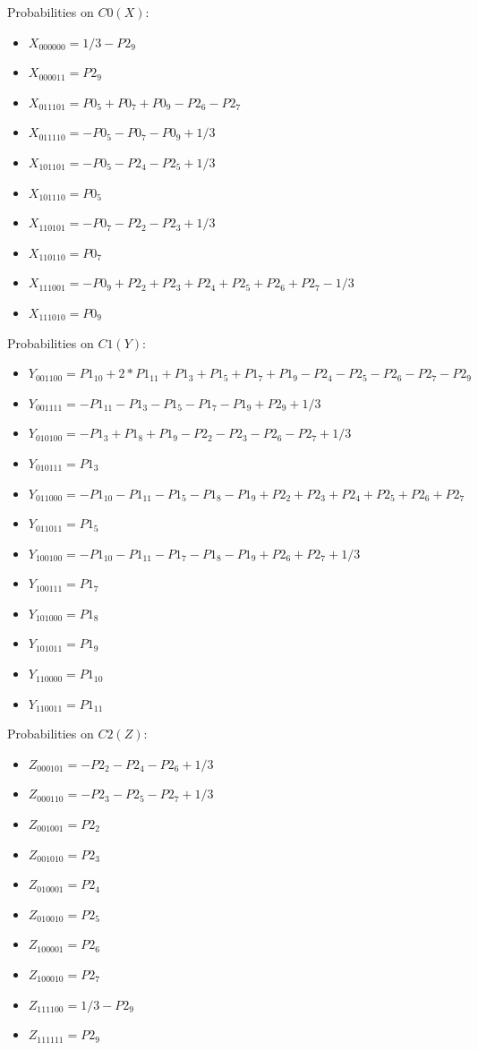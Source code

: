 \documentclass[11pt]{article}
\begin{document}
Probabilities on $C0 (X)$:
\begin{itemize}
    \item $X_{000000} = 1/3 - P2_9$
    \item $X_{000011} = P2_9$
    \item $X_{011101} = P0_5 + P0_7 + P0_9 - P2_6 - P2_7$
    \item $X_{011110} = -P0_5 - P0_7 - P0_9 + 1/3$
    \item $X_{101101} = -P0_5 - P2_4 - P2_5 + 1/3$
    \item $X_{101110} = P0_5$
    \item $X_{110101} = -P0_7 - P2_2 - P2_3 + 1/3$
    \item $X_{110110} = P0_7$
    \item $X_{111001} = -P0_9 + P2_2 + P2_3 + P2_4 + P2_5 + P2_6 + P2_7 - 1/3$
    \item $X_{111010} = P0_9$
\end{itemize}

Probabilities on $C1 (Y)$:
\begin{itemize}
    \item $Y_{001100} = P1_{10} + 2*P1_{11} + P1_3 + P1_5 + P1_7 + P1_9 - P2_4 - P2_5 - P2_6 - P2_7 - P2_9$
    \item $Y_{001111} = -P1_{11} - P1_3 - P1_5 - P1_7 - P1_9 + P2_9 + 1/3$
    \item $Y_{010100} = -P1_3 + P1_8 + P1_9 - P2_2 - P2_3 - P2_6 - P2_7 + 1/3$
    \item $Y_{010111} = P1_3$
    \item $Y_{011000} = -P1_{10} - P1_{11} - P1_5 - P1_8 - P1_9 + P2_2 + P2_3 + P2_4 + P2_5 + P2_6 + P2_7$
    \item $Y_{011011} = P1_5$
    \item $Y_{100100} = -P1_{10} - P1_{11} - P1_7 - P1_8 - P1_9 + P2_6 + P2_7 + 1/3$
    \item $Y_{100111} = P1_7$
    \item $Y_{101000} = P1_8$
    \item $Y_{101011} = P1_9$
    \item $Y_{110000} = P1_{10}$
    \item $Y_{110011} = P1_{11}$
\end{itemize}

Probabilities on $C2 (Z)$:
\begin{itemize}
    \item $Z_{000101} = -P2_2 - P2_4 - P2_6 + 1/3$
    \item $Z_{000110} = -P2_3 - P2_5 - P2_7 + 1/3$
    \item $Z_{001001} = P2_2$
    \item $Z_{001010} = P2_3$
    \item $Z_{010001} = P2_4$
    \item $Z_{010010} = P2_5$
    \item $Z_{100001} = P2_6$
    \item $Z_{100010} = P2_7$
    \item $Z_{111100} = 1/3 - P2_9$
    \item $Z_{111111} = P2_9$
\end{itemize}
\end{document}
